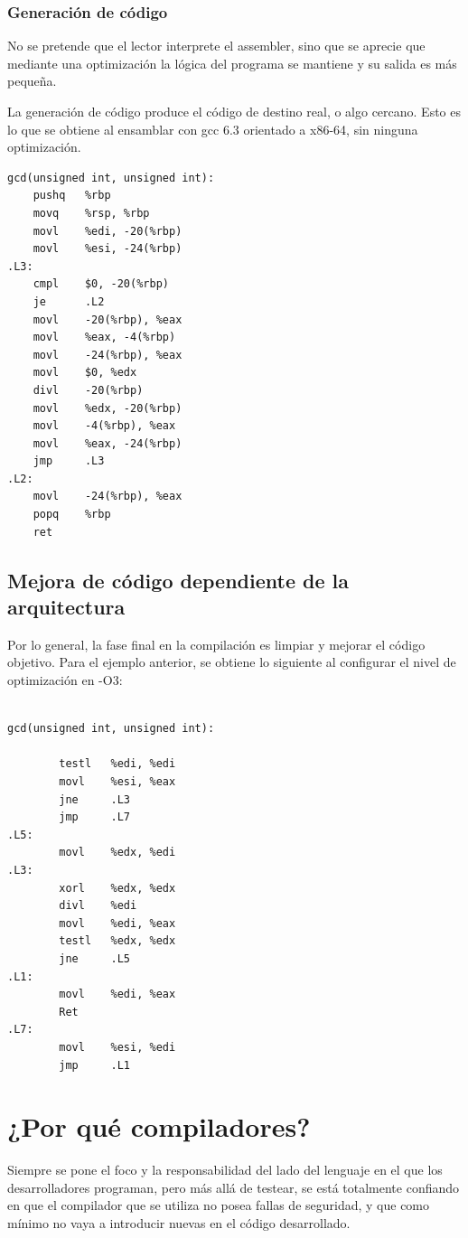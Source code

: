 \subsubsection{Generación de código}
No se pretende que el lector interprete el assembler, sino que se aprecie que mediante una optimización la lógica del programa se mantiene y su salida es más pequeña.

La generación de código produce el código de destino real, o algo cercano. Esto es lo que se obtiene al ensamblar con gcc 6.3 orientado a x86-64, sin ninguna optimización.

\begin{lstlisting}[language={[x86masm]Assembler}, label={lst:assembler simple}, caption={Ejemplo assembler sin mejora}, captionpos={b}, frame={shadowbox}]
gcd(unsigned int, unsigned int):
    pushq   %rbp
    movq    %rsp, %rbp
    movl    %edi, -20(%rbp)
    movl    %esi, -24(%rbp)
.L3:
    cmpl    $0, -20(%rbp)
    je      .L2
    movl    -20(%rbp), %eax
    movl    %eax, -4(%rbp)
    movl    -24(%rbp), %eax
    movl    $0, %edx
    divl    -20(%rbp)
    movl    %edx, -20(%rbp)
    movl    -4(%rbp), %eax
    movl    %eax, -24(%rbp)
    jmp     .L3
.L2:
    movl    -24(%rbp), %eax
    popq    %rbp
    ret
\end{lstlisting}


\subsection{Mejora de código dependiente de la arquitectura}

Por lo general, la fase final en la compilación es limpiar y mejorar el código objetivo. Para el ejemplo anterior, se obtiene lo siguiente al configurar el nivel de optimización en -O3:
\begin{lstlisting}[language={[x86masm]Assembler}, label={lst:assembler improved}, caption={Ejemplo assembler con mejora}, captionpos={b}, frame={shadowbox}]

gcd(unsigned int, unsigned int):

        testl   %edi, %edi
        movl    %esi, %eax
        jne     .L3
        jmp     .L7
.L5:
        movl    %edx, %edi
.L3:
        xorl    %edx, %edx
        divl    %edi
        movl    %edi, %eax
        testl   %edx, %edx
        jne     .L5
.L1:
        movl    %edi, %eax
        Ret
.L7:
        movl    %esi, %edi
        jmp     .L1
\end{lstlisting}


\section{¿Por qué compiladores?}
Siempre se pone el foco y la responsabilidad del lado del lenguaje en el que los desarrolladores programan, pero más allá de testear, se está totalmente confiando en que el compilador que se utiliza no posea fallas de seguridad, y que como mínimo no vaya a introducir nuevas en el código desarrollado.


